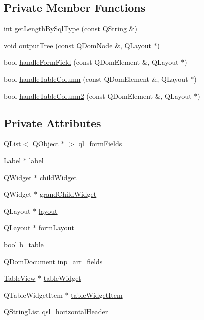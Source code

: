 \subsection*{Private Member Functions}
\begin{DoxyCompactItemize}
\item 
int \hyperlink{classXML2Form_ae1ab9e5e978954651c10800d4dd16b89}{getLengthBySqlType} (const QString \&)
\item 
void \hyperlink{classXML2Form_a4302872a12a04aa016619a235698a8db}{outputTree} (const QDomNode \&, QLayout $\ast$)
\item 
bool \hyperlink{classXML2Form_a97a812b4c01de1a025894fbbc5e1270f}{handleFormField} (const QDomElement \&, QLayout $\ast$)
\item 
bool \hyperlink{classXML2Form_ad1f3322e4844ad7ede46bd5a2360d4f6}{handleTableColumn} (const QDomElement \&, QLayout $\ast$)
\item 
bool \hyperlink{classXML2Form_aca6f9a788c34548d890c8bb9d57ef6e9}{handleTableColumn2} (const QDomElement \&, QLayout $\ast$)
\end{DoxyCompactItemize}
\subsection*{Private Attributes}
\begin{DoxyCompactItemize}
\item 
QList$<$ QObject $\ast$ $>$ \hyperlink{classXML2Form_a4b16916a87a4c7d23e5708d47c211777}{ql\_\-formFields}
\item 
\hyperlink{classLabel}{Label} $\ast$ \hyperlink{classXML2Form_ade9a27a26e1d017fd4f851b5007741af}{label}
\item 
QWidget $\ast$ \hyperlink{classXML2Form_a22c224e3d1fa058bff67bea04cf0a35b}{childWidget}
\item 
QWidget $\ast$ \hyperlink{classXML2Form_ab1d32c23c4b270fd000b5e2d09272f31}{grandChildWidget}
\item 
QLayout $\ast$ \hyperlink{classXML2Form_a23039ea01dc3a50ee859e12b645774b5}{layout}
\item 
QLayout $\ast$ \hyperlink{classXML2Form_a54e053fb4e1186a487f9bce37b9ef078}{formLayout}
\item 
bool \hyperlink{classXML2Form_a81704c4b6c2ec90cd5dab7c6617b2349}{b\_\-table}
\item 
QDomDocument \hyperlink{classXML2Form_ac74f0507d6417126e8f10a81f659d51d}{inp\_\-arr\_\-fields}
\item 
\hyperlink{classTableView}{TableView} $\ast$ \hyperlink{classXML2Form_a3e475b021d282927ffd56f28c6836477}{tableWidget}
\item 
QTableWidgetItem $\ast$ \hyperlink{classXML2Form_a0a01128f9b5e28a00315cb83369727ee}{tableWidgetItem}
\item 
QStringList \hyperlink{classXML2Form_adaf365aa28cc5d86386e0dbc0da773c2}{qsl\_\-horizontalHeader}
\end{DoxyCompactItemize}



